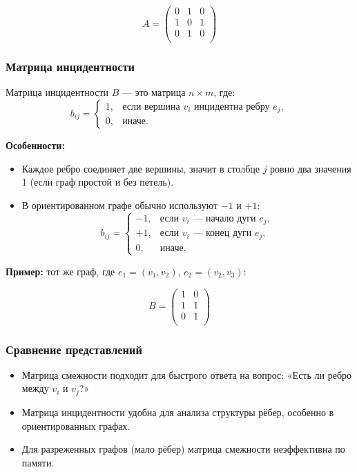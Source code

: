 \[
A =
\begin{pmatrix}
  0 & 1 & 0 \\
  1 & 0 & 1 \\
  0 & 1 & 0 \\
\end{pmatrix}
\]

\subsubsection{Матрица инцидентности}

Матрица инцидентности $B$ — это матрица $n \times m$, где:
\[
  b_{ij} = \begin{cases}
    1, & \text{если вершина } v_i \text{ инцидентна ребру } e_j, \\
    0, & \text{иначе}.
  \end{cases}
\]

\textbf{Особенности:}
\begin{itemize}[leftmargin=*]
  \item Каждое ребро соединяет две вершины, значит в столбце $j$ ровно два значения 1 (если граф простой и без петель).
  \item В ориентированном графе обычно используют $-1$ и $+1$:  
    \[
    b_{ij} = \begin{cases}
      -1, & \text{если } v_i \text{ — начало дуги } e_j, \\
      +1, & \text{если } v_i \text{ — конец дуги } e_j, \\
      0, & \text{иначе}.
    \end{cases}
    \]
\end{itemize}

\textbf{Пример:} тот же граф, где $e_1 = (v_1,v_2)$, $e_2 = (v_2,v_3)$:

\[
B =
\begin{pmatrix}
  1 & 0 \\
  1 & 1 \\
  0 & 1 \\
\end{pmatrix}
\]

\subsubsection{Сравнение представлений}

\begin{itemize}[leftmargin=*]
  \item Матрица смежности подходит для быстрого ответа на вопрос: «Есть ли ребро между $v_i$ и $v_j$?»
  \item Матрица инцидентности удобна для анализа структуры рёбер, особенно в ориентированных графах.
  \item Для разреженных графов (мало рёбер) матрица смежности неэффективна по памяти.
\end{itemize}

